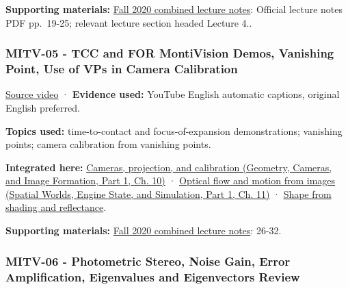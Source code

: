 \textbf{Supporting materials:} \href{https://ocw.mit.edu/courses/6-801-machine-vision-fall-2020/9ec44f69e72995c370b3797818ba01e6_MIT6_801F20_lectureNotes.pdf}{Fall 2020 combined lecture notes}: Official lecture notes PDF pp.~19-25; relevant lecture section headed Lecture 4..

\subsubsection{MITV-05 - TCC and FOR MontiVision Demos, Vanishing Point, Use of VPs in Camera Calibration}\label{04-visual-computing-ii-ch036-mitv-05---tcc-and-for-montivision-demos-vanishing-point-use-of-vps-in-camera-calibration}

\hypertarget{04-visual-computing-ii-ch036-mitv-05---tcc-and-for-montivision-demos-vanishing-point-use-of-vps-in-camera-calibration}{}

\href{https://www.youtube.com/watch?v=SSlPV1iYjHw}{Source video} · \textbf{Evidence used:} YouTube English automatic captions, original English preferred.

\textbf{Topics used:} time-to-contact and focus-of-expansion demonstrations; vanishing points; camera calibration from vanishing points.

\textbf{Integrated here:} \href{../03-Geometry-Cameras-and-Image-Formation-P01/main.pdf\#nameddest=03-visual-computing-i-ch003-cameras-projection-and-calibration}{Cameras, projection, and calibration (Geometry, Cameras, and Image Formation, Part 1, Ch. 10)} · \href{../05-Spatial-Worlds-Engine-State-and-Simulation-P01/main.pdf\#nameddest=04-visual-computing-ii-ch030-optical-flow-and-motion-from-images}{Optical flow and motion from images (Spatial Worlds, Engine State, and Simulation, Part 1, Ch. 11)} · \hyperref[04-visual-computing-ii-ch032-shape-from-shading-and-reflectance]{Shape from shading and reflectance}.

\textbf{Supporting materials:} \href{https://ocw.mit.edu/courses/6-801-machine-vision-fall-2020/9ec44f69e72995c370b3797818ba01e6_MIT6_801F20_lectureNotes.pdf}{Fall 2020 combined lecture notes}: 26-32.

\subsubsection{MITV-06 - Photometric Stereo, Noise Gain, Error Amplification, Eigenvalues and Eigenvectors Review}\label{04-visual-computing-ii-ch036-mitv-06---photometric-stereo-noise-gain-error-amplification-eigenvalues-and-eigenvectors-review}


